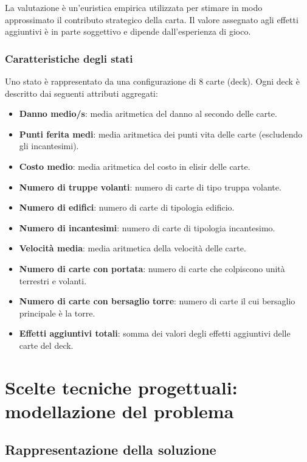 \documentclass{article}
\begin{document}
La valutazione è un’euristica empirica utilizzata per stimare in modo approssimato il contributo strategico della carta.
Il valore assegnato agli effetti aggiuntivi è in parte soggettivo e dipende dall’esperienza di gioco.

\subsubsection{Caratteristiche degli stati}

Uno stato è rappresentato da una configurazione di 8 carte (deck). 
Ogni deck è descritto dai seguenti attributi aggregati:

\begin{itemize}
    \item \textbf{Danno medio/s}: media aritmetica del danno al secondo delle carte.
    \item \textbf{Punti ferita medi}: media aritmetica dei punti vita delle carte (escludendo gli incantesimi).
    \item \textbf{Costo medio}: media aritmetica del costo in elisir delle carte.
    \item \textbf{Numero di truppe volanti}: numero di carte di tipo truppa volante.
    \item \textbf{Numero di edifici}: numero di carte di tipologia edificio.
    \item \textbf{Numero di incantesimi}: numero di carte di tipologia incantesimo.
    \item \textbf{Velocità media}: media aritmetica della velocità delle carte.
    \item \textbf{Numero di carte con portata}: numero di carte che colpiscono unità terrestri e volanti.
    \item \textbf{Numero di carte con bersaglio torre}: numero di carte il cui bersaglio principale è la torre.
    \item \textbf{Effetti aggiuntivi totali}: somma dei valori degli effetti aggiuntivi delle carte del deck.
\end{itemize}


\section{Scelte tecniche progettuali: modellazione del problema}

\subsection{Rappresentazione della soluzione}
\end{document}
